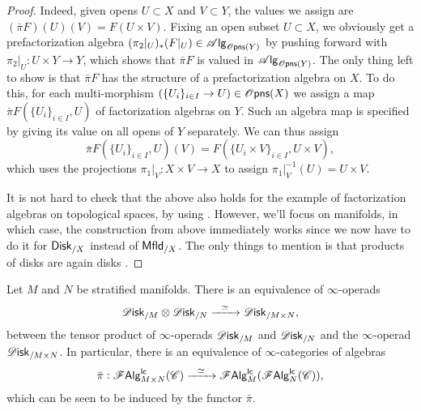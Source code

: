 \documentclass[../text.tex]{subfiles}
\begin{document}
\begin{proof}
    Indeed, given opens $U \subset X$ and $V \subset Y$, the values we assign are $(\bar{\pi}F) (U)(V) = F(U \times V)$. Fixing an open subset $U \subset X$, we obviously get a prefactorization algebra $(\pi_2|_U)_* (F|_U) \in \alg{\opens(Y)}$ by pushing forward with $\pi_2|_U: U \times Y \rightarrow Y$, which shows that $\bar{\pi}F$ is valued in $\alg{\opens(Y)}$. The only thing left to show is that $\bar{\pi} F$ has the structure of a prefactorization algebra on $X$. To do this, for each multi-morphism $(\{ U_i \}_{i \in I} \rightarrow U) \in \opens(X)$ we assign a map $\bar{\pi}F (\{ U_i \}_{i \in I}, U)$ of factorization algebras on $Y$. Such an algebra map is specified by giving its value on all opens of $Y$ separately. We can thus assign
    \begin{equation}
        \bar{\pi}F (\{ U_i \}_{i \in I}, U)(V) = F(\{ U_i \times V \}_{i \in I}, U \times V),
    \end{equation}
    which uses the projections $\pi_1|_V : X \times V \rightarrow X$ to assign $\pi_1|_V^{-1}(U) = U \times V$.

    It is not hard to check that the above also holds for the example of factorization algebras on topological spaces, by using \cite[\S7.2]{cg2016}. However, we'll focus on manifolds, in which case, the construction from above immediately works since we now have to do it for $\disk[r]_{/X}$ instead of $\mfld[r]_{/X}$. The only things to mention is that products of disks are again disks \cite[cor.3.4.9]{aft_localstrut}.
\end{proof}


\begin{theorem}[Additivity]\label{thm:additivity_lc}
    Let $M$ and $N$ be stratified manifolds. There is an equivalence of $\infty$-operads
    \begin{equation}
        \disk_{/M} \otimes \disk_{/N} \xrightarrow{\ \ \simeq \ \ } \disk_{/M \times N},
    \end{equation}
    between the tensor product of $\infty$-operads $\disk_{/M}$ and $\disk_{/N}$ and the $\infty$-operad $\disk_{/M \times N}$. In particular, there is an equivalence of $\infty$-categories of algebras
    \begin{equation}
        \bar{\pi}: \mathscr{F} \mathsf{Alg}^{\mathsf{lc}}_{M \times N}(\mathscr{C}) \xrightarrow{\ \ \simeq \ \ } \mathscr{F} \mathsf{Alg}^{\mathsf{lc}}_{M}(\mathscr{F} \mathsf{Alg}^{\mathsf{lc}}_{N}(\mathscr{C})),
    \end{equation}
    which can be seen to be induced by the functor $\bar{\pi}$.
\end{theorem}
\end{document}
